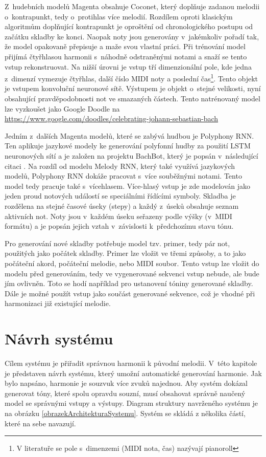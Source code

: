 Z~hudebních modelů Magenta obsahuje Coconet, 
který doplňuje zadanou melodii o~kontrapunkt, 
tedy o~protihlas více melodií\cite{kofron, huang2017counterpoint}.
Rozdílem oproti klasickým algoritmům doplňující kontrapunkt
je oproštění od chronologického postupu od začátku skladby ke konci.
Naopak noty jsou generovány v~jakémkoliv pořadí tak, 
že model opakovaně přepisuje a maže svou vlastní práci.
Při trénování model přijímá čtyřhlasou harmonii s~náhodně odstraněnými notami a snaží se tento vstup rekonstruovat.
Na nižší úrovni je vstup tří dimenzionální pole, 
kde jedna z~dimenzí vymezuje čtyřhlas, další číslo MIDI noty a poslední čas\footnote{V literatuře se pole s~dimenzemi (MIDI nota, čas) nazývají pianoroll}.
Tento objekt je vstupem konvoluční neuronové sítě.  
Výstupem je objekt o~stejné velikosti, 
nyní obsahující pravděpodobnosti not ve smazaných částech.
\cite{huang2017counterpoint}
Tento natrénovaný model lze vyzkoušet jako Google Doodle na \url{https://www.google.com/doodles/celebrating-johann-sebastian-bach}
\par
Jedním z~dalších Magenta modelů, které se zabývá hudbou je Polyphony RNN. 
Ten aplikuje jazykové modely ke generování polyfonní hudby za použití LSTM neuronových sítí
a je založen na projektu BachBot, který je popsán v~následující citaci \cite{Liang_AutomaticComposition}.
Na rozdíl od modelu Melody RNN, který také využívá jazykových modelů, 
Polyphony RNN dokáže pracovat s~více souběžnými notami.
Tento model tedy pracuje také s~vícehlasem.
Více-hlasý vstup je zde modelován jako jeden proud notových událostí se speciálními řídícími symboly.
Skladba je rozdělena na stejné časové úseky (stepy) 
a každý z~úseků obsahuje seznam aktivních not.
Noty jsou v~každém úseku seřazeny podle výšky (v~MIDI formátu) 
a je popsán jejich vztah v~závislosti k~předchozímu stavu tónu.
\cite{google_git_polyphony}

Pro generování nové skladby potřebuje model tzv. primer, tedy pár not, 
použitých jako počátek skladby. 
Primer lze vložit ve třemi způsoby, a to jako počáteční akord,
počáteční melodie, nebo MIDI soubor.
Tento vstup lze vložit do modelu před generováním,
tedy ve vygenerované sekvenci vstup nebude, ale bude jím ovlivněn.
Toto se hodí například pro ustanovení tóniny generované skladby.
Dále je možné použít vstup jako součást generované sekvence,
což je vhodné při harmonizaci již existující melodie.
\cite{google_git_polyphony}

\chapter{Návrh systému}
\label{navrhSystemu}
Cílem systému je přiřadit správnou harmonii k původní melodii.
V~této kapitole je představen návrh systému,
který umožní automatické generování harmonie.
Jak bylo napsáno, harmonie je souzvuk více zvuků najednou.
Aby systém dokázal generovat tóny, které spolu opravdu souzní,
musí obsahovat správně naučený model se správnými vstupy a výstupy.
Diagram struktury navrženého systému je na obrázku \ref{obrazekArchitekturaSystemu}.
Systém se skládá z několika částí, 
které na sebe navazují.


